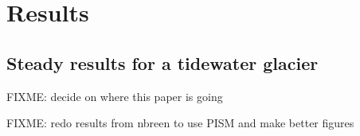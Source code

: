 \documentclass[11pt,final]{amsart}
\begin{document}
\section{Results}  \label{sec:results}

\subsection*{Steady results for a tidewater glacier}

FIXME: decide on where this paper is going

FIXME: redo results from nbreen to use PISM and make better figures

\end{document}

